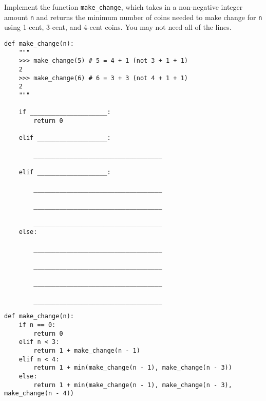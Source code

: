 \begin{blocksection}
\question 
Implement the function \lstinline{make_change}, which takes in a non-negative integer amount \lstinline{n} and returns the minimum number of coins needed to make change for \lstinline{n} using 1-cent, 3-cent, and 4-cent coins. You may not need all of the lines.

\begin{lstlisting}
def make_change(n):
    """
    >>> make_change(5) # 5 = 4 + 1 (not 3 + 1 + 1)
    2
    >>> make_change(6) # 6 = 3 + 3 (not 4 + 1 + 1)
    2
    """

    if _____________________:
        return 0

    elif ___________________:

        ___________________________________

    elif ___________________:

        ___________________________________

        ___________________________________

        ___________________________________
    else:

        ___________________________________

        ___________________________________

        ___________________________________

        ___________________________________
\end{lstlisting}
\end{blocksection}

\begin{blocksection}
\begin{solution}
\begin{lstlisting}
def make_change(n):
    if n == 0:
        return 0
    elif n < 3:
        return 1 + make_change(n - 1)
    elif n < 4:
        return 1 + min(make_change(n - 1), make_change(n - 3))
    else:
        return 1 + min(make_change(n - 1), make_change(n - 3), make_change(n - 4))
\end{lstlisting}
\end{solution}
\end{blocksection}
